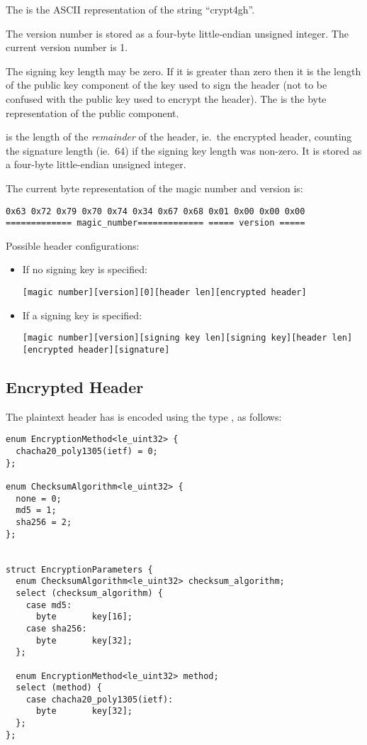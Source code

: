 The  is the ASCII representation of the string ``crypt4gh''.

The version number is stored as a four-byte little-endian unsigned integer.
%
The current version number is 1.

The signing key length may be zero.
%
If it is greater than zero then it is the length of the public key
component of the key used to sign the header (not to be confused with
the public key used to encrypt the header).
%
The  is the byte representation of the public
component.

 is the length of the \emph{remainder} of the header,
ie.\ the encrypted header, counting the signature length (ie.\ 64) if
the signing key length was non-zero.
%
It is stored as a four-byte little-endian unsigned integer.

The current byte representation of the magic number and version is:
\begin{verbatim}
0x63 0x72 0x79 0x70 0x74 0x34 0x67 0x68 0x01 0x00 0x00 0x00
============= magic_number============= ===== version =====
\end{verbatim}

Possible header configurations:
%
\begin{itemize}
%
\item If no signing key is specified:
\begin{verbatim}
[magic number][version][0][header len][encrypted header]
\end{verbatim}
%
\item If a signing key is specified:
\begin{verbatim}
[magic number][version][signing key len][signing key][header len][encrypted header][signature]
\end{verbatim}
%
\end{itemize}


\subsection{Encrypted Header}
%

The plaintext header has is encoded using the type
, as follows:

\begin{verbatim}
enum EncryptionMethod<le_uint32> {
  chacha20_poly1305(ietf) = 0;
};

enum ChecksumAlgorithm<le_uint32> {
  none = 0;
  md5 = 1;
  sha256 = 2;
};


struct EncryptionParameters {
  enum ChecksumAlgorithm<le_uint32> checksum_algorithm;
  select (checksum_algorithm) {
    case md5:
      byte       key[16];
    case sha256:
      byte       key[32];
  };

  enum EncryptionMethod<le_uint32> method;
  select (method) {
    case chacha20_poly1305(ietf):
      byte       key[32];
  };
};
\end{verbatim}

